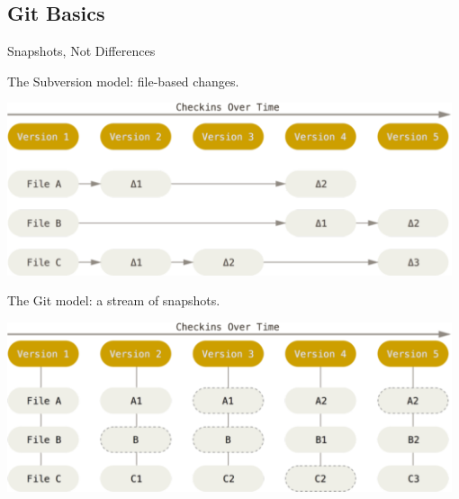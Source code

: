 \subsection{Git Basics}
\begin{frame}[t,allowframebreaks]{Snapshots, Not Differences}

  The Subversion model: file-based changes.

  \begin{center}
    \includegraphics[width=0.98\textwidth]{./images/02-getting-started/deltas}
  \end{center}

  \pagebreak

  The Git model: a stream of snapshots.

  \begin{center}
    \includegraphics[width=0.98\textwidth]{./images/02-getting-started/snapshots}
  \end{center}

\end{frame}

